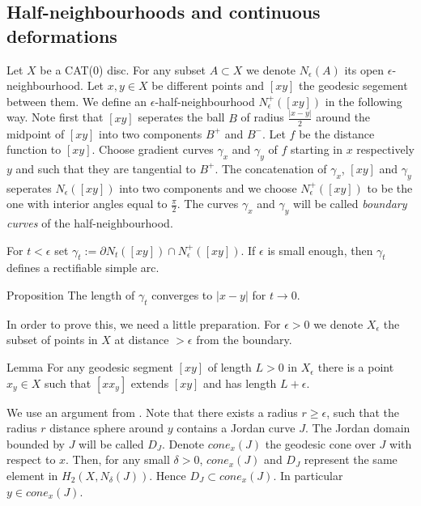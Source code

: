 \documentclass[a4paper,10pt]{amsart}
\begin{document}
 

\subsection{Half-neighbourhoods and continuous deformations}

Let $X$ be a CAT(0) disc. For any subset $A\subset X$ we denote $N_\epsilon (A)$ its open $\epsilon$-neighbourhood.
Let $x,y\in X$ be different points and $[xy]$ the geodesic segement between them. We define an $\epsilon$-half-neighbourhood
$N^+_\epsilon ([xy])$ in the following way. Note first that $[xy]$ seperates the ball $B$ of radius $\frac{|x-y|}{2}$ around
the midpoint of $[xy]$ into two components $B^+$ and $B^-$. Let $f$ be the distance function to $[xy]$. Choose gradient curves 
$\gamma_x$ and $\gamma_y$ of $f$ starting in $x$ respectively $y$ and such that they are tangential to $B^+$. The concatenation
of $\gamma_x$, $[xy]$ and $\gamma_y$ seperates $N_\epsilon([xy])$ into two components and we choose $N^+_\epsilon ([xy])$ to be the one
with interior angles equal to  $\frac{\pi}{2}$. The curves $\gamma_x$ and $\gamma_y$ will be called {\em boundary curves} of the 
half-neighbourhood.


For $t<\epsilon$ set $\gamma_t:=\partial N_t([xy])\cap N^+_\epsilon ([xy])$. If $\epsilon$
is small enough, then $\gamma_t$ defines a rectifiable simple arc.


\begin{thm}{Proposition}\label{prop:length continuity}
The length of $\gamma_t$ converges to $|x-y|$ for $t\to 0$.
\end{thm}

In order to prove this, we need a little preparation. For $\epsilon>0$ we denote
$X_\epsilon$ the subset of points in $X$ at distance $>\epsilon$ from the boundary.

\begin{thm}{Lemma}\label{lem:extension}
For any geodesic segment $[xy]$ of length $L>0$ in $X_\epsilon$ there is a point 
$x_y\in X$ such that $[x x_y]$ extends $[xy]$ and has length $L+\epsilon$.
\end{thm}
We use an argument from \cite{Kleiner}. Note that there exists a radius $r\geq\epsilon$, such 
that the radius $r$ distance sphere around $y$ contains a Jordan curve $J$. The Jordan domain bounded by $J$
will be called $D_J$.
Denote $cone_x(J)$ the geodesic cone over $J$ with respect to $x$. Then, 
for any small $\delta>0$, $cone_x(J)$ and $D_J$
represent the same element in $H_2(X,N_\delta(J))$. Hence $D_J\subset cone_x(J)$. 
In particular $y\in cone_x(J)$.
\qeds
\end{document}
